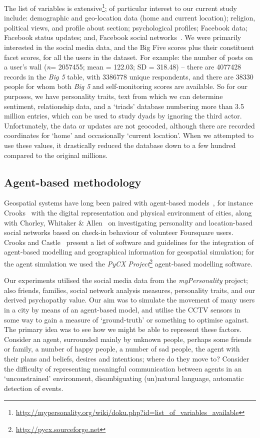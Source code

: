 \documentclass[conference]{IEEEtran}
\begin{document}
The list of variables is
extensive\footnote{\url{http://mypersonality.org/wiki/doku.php?id=list_of_variables_available}};
of particular interest to our current study include: demographic and
geo-location data (home and current location); religion, political
views, and profile about section; psychological profiles; Facebook
data; Facebook status updates; and, Facebook social
networks~\cite{kosinski-et-al:2013}. We were primarily interested in
the social media data, and the Big Five scores plus their constituent
facet scores, for all the users in the dataset. For example: the
number of posts on a user's wall ({\emph{n}}= 2057455; mean = 122.03;
SD = 318.48) -- there are 4077428 records in the {\emph{Big 5}} table,
with 3386778 unique respondents, and there are 38330 people for whom
both {\emph{Big 5}} and self-monitoring scores are available. So for
our purposes, we have personality traits, text from which we can
determine sentiment, relationship data, and a `triads' database
numbering more than 3.5 million entries, which can be used to study
dyads by ignoring the third actor. Unfortunately, the data or updates
are not geocoded, although there are recorded coordinates for `home'
and occasionally `current location'. When we attempted to use these
values, it drastically reduced the database down to a few hundred
compared to the original millions.

\subsection{Agent-based methodology}

Geospatial systems have long been paired with agent-based
models~\cite{gerritsen:2015}, for instance Crooks~\cite{crooks:2012}
with the digital representation and physical environment of cities,
along with Chorley, Whitaker \& Allen~\cite{chorley-et-al:2015} on
investigating personality and location-based social networks based on
check-in behaviour of volunteer Foursquare users. Crooks and
Castle~\cite{crooks+castle:2012} present a list of software and
guidelines for the integration of agent-based modelling and
geographical information for geospatial simulation; for the agent
simulation we used the {\emph{PyCX
Project}}\footnote{\url{http://pycx.sourceforge.net}} agent-based
modelling software.

Our experiments utilised the social media data from the
{\emph{myPersonality}} project; also friends, families, social network
analysis measures, personality traits, and our derived psychopathy
value. Our aim was to simulate the movement of many users in a city by
means of an agent-based model, and utilise the CCTV sensors in some
way to gain a measure of `ground-truth' or something to optimise
against. The primary idea was to see how we might be able to represent
these factors. Consider an agent, surrounded mainly by unknown people,
perhaps some friends or family, a number of happy people, a number of
sad people, the agent with their plans and beliefs, desires and
intentions; where do they move to? Consider the difficulty of
representing meaningful communication between agents in an
`unconstrained' environment, disambiguating (un)natural language,
automatic detection of events.
\end{document}
